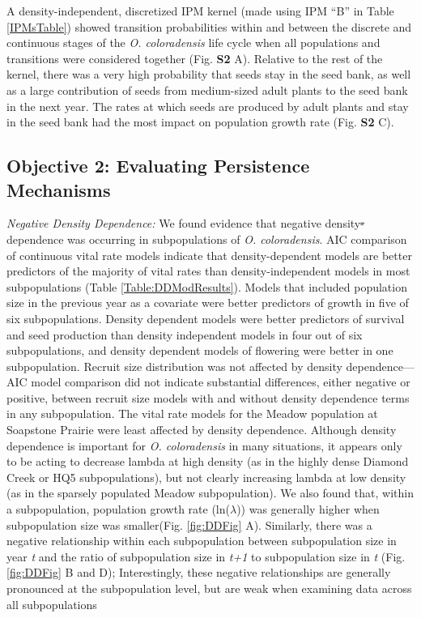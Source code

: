 \documentclass[12pt, letterpaper]{article}
\begin{document}
A density-independent, discretized IPM kernel (made using IPM “B” in Table \ref{IPMsTable}) showed transition probabilities within and between the discrete and continuous stages of the \textit{O. coloradensis} life cycle when all populations and transitions were considered together (Fig. \textbf{S2} A). Relative to the rest of the kernel, there was a very high probability that seeds stay in the seed bank, as well as a large contribution of seeds from medium-sized adult plants to the seed bank in the next year. The rates at which seeds are produced by adult plants and stay in the seed bank had the most impact on population growth rate (Fig.\textbf{ S2} C).


\subsection{Objective 2: Evaluating Persistence Mechanisms}

\textit{Negative Density Dependence:} We found evidence that negative density\sout{-} dependence was occurring in subpopulations of \textit{O. coloradensis}. AIC comparison of continuous vital rate models indicate that density-dependent models are better predictors of the majority of vital rates than density-independent models in most subpopulations (Table \ref{Table:DDModResults}).  Models that included population size in the previous year as a covariate were better predictors of growth in five of six subpopulations. Density dependent models were better predictors of survival and seed production than density independent models in four out of six subpopulations, and density dependent models of flowering were better in one subpopulation. Recruit size distribution was not affected by density dependence—AIC model comparison did not indicate substantial differences, either negative or positive, between recruit size models with and without density dependence terms in any subpopulation. The vital rate models for the Meadow population at Soapstone Prairie were least affected by density dependence. Although density dependence is important for \textit{O. coloradensis} in many situations, it appears only to be acting to decrease lambda at high density (as in the highly dense Diamond Creek or HQ5 subpopulations), but not clearly increasing lambda at low density (as in the sparsely populated Meadow subpopulation). We also found that, within a subpopulation, population growth rate (ln($\lambda$)) was generally higher when subpopulation size was smaller(Fig. \ref{fig:DDFig} A). Similarly, there was a negative relationship within each subpopulation between subpopulation size in year \textit{t} and the ratio of subpopulation size in \textit{t+1} to subpopulation size in \textit{t} (Fig. \ref{fig:DDFig} B and D); Interestingly, these negative relationships are generally pronounced at the subpopulation level, but are weak when examining data across all subpopulations
\end{document}
